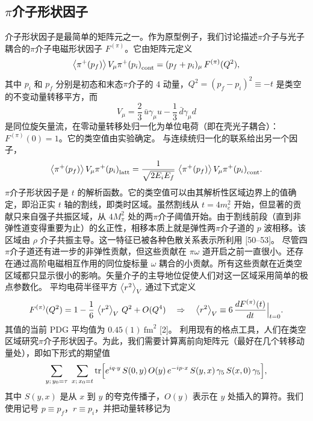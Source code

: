 \subsection{$\pi$介子形状因子}
介子形状因子是最简单的矩阵元之一。作为原型例子，我们讨论描述$\pi$介子与光子耦合的$\pi$介子电磁形状因子 $F^{(\pi)}$。它由矩阵元定义
\begin{equation}
\left\langle \pi^+(p_f) \right\rangle{V_\mu}{\pi^+(p_i)}_{\mathrm{cont}} = (p_f + p_i)_\mu\, F^{(\pi)}(Q^2) ,
\end{equation}
其中 $p_i$ 和 $p_f$ 分别是初态和末态$\pi$介子的 4 动量，$Q^2 = (p_f - p_i)^2 \equiv -t$ 是类空的不变动量转移平方，而
\begin{equation}
V_\mu = \frac{2}{3}\,\bar{u}\gamma_\mu u - \frac{1}{3}\,\bar{d}\gamma_\mu d
\end{equation}
是同位旋矢量流，在零动量转移处归一化为单位电荷（即在壳光子耦合）：$F^{(\pi)}(0) = 1$。它的类空值由实验确定。
与连续统归一化的联系给出另一个因子，
\begin{equation}
\left\langle \pi^+(p_f) \right\rangle{V_\mu}{\pi^+(p_i)}_{\mathrm{latt}}
= \frac{1}{\sqrt{2E_iE_f}}\,
\left\langle \pi^+(p_f) \right\rangle{V_\mu}{\pi^+(p_i)}_{\mathrm{cont}} .
\end{equation}
$\pi$介子形状因子是 $t$ 的解析函数。它的类空值可以由其解析性区域边界上的值确定，即沿正实 $t$ 轴的割线，即类时区域。虽然割线从 $t = 4m_e^2$ 开始，但显著的贡献只来自强子共振区域，从 $4M_\pi^2$ 处的两$\pi$介子阈值开始。由于割线前段（直到非弹性道变得重要为止）的幺正性，相移本质上就是弹性两$\pi$介子道的 $p$ 波相移。该区域由 $\rho$ 介子共振主导。这一特征已被各种色散关系表示所利用 [50--53]。
尽管四$\pi$介子道还有进一步的非弹性贡献，但这些贡献在 $\pi\omega$ 道开启之前一直很小。还存在通过高阶电磁相互作用的同位旋标量 $\omega$ 耦合的小贡献。所有这些贡献在近类空区域都只显示很小的影响。矢量介子的主导地位促使人们对这一区域采用简单的极点参数化。
平均电荷半径平方 $\left\langle r^2 \right\rangle_V$ 通过下式定义
\begin{equation}
F^{(\pi)}(Q^2) = 1 - \frac{1}{6}\,\left\langle r^2 \right\rangle_V\, Q^2 + O(Q^4)
\quad\Rightarrow\quad
\left\langle r^2 \right\rangle_V \equiv 6\,\frac{dF^{(\pi)}(t)}{dt}\Big|_{t=0} .
\end{equation}
其值的当前 PDG 平均值为 $0.45(1)~\mathrm{fm}^2$ [2]。
利用现有的格点工具，人们在类空区域研究$\pi$介子形状因子。为此，我们需要计算离前向矩阵元（最好在几个转移动量处），即如下形式的期望值
\begin{equation}
\sum_{y;\,y_0=\tau}\;\sum_{x;\,x_0=t}
\operatorname{tr}\Bigl[e^{iq\cdot y}\, S(0, y)\, O(y)\,
e^{-ip\cdot x}\, S(y, x)\,\gamma_5\, S(x, 0)\,\gamma_5\Bigr] ,
\end{equation}
其中 $S(y, x)$ 是从 $x$ 到 $y$ 的夸克传播子，$O(y)$ 表示在 $y$ 处插入的算符。我们使用记号 $p \equiv p_f$，$r \equiv p_i$，并把动量转移记为

